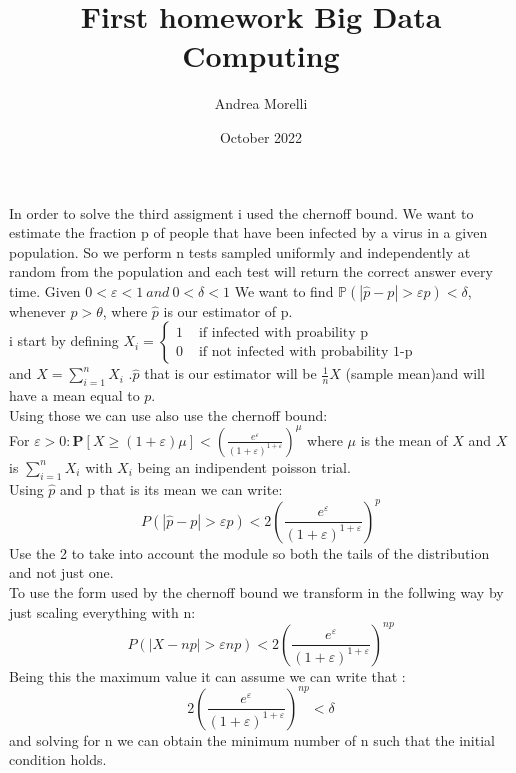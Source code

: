 \documentclass{article}
\title{First homework Big Data Computing}
\author{Andrea Morelli}
\date{October 2022}
\begin{document}
\maketitle

\section{}

\section{}



\section{}
In order to solve the third assigment i used the chernoff bound.
We want to estimate the fraction p of people that have been infected by a virus in a given population.
So we perform n tests sampled uniformly and independently at random from the population and each test will return the correct answer every time.
Given $0<\varepsilon<1   \ and  \ 0<\delta<1$ We want to find $\mathbb{P}(|\hat{p}-p|>\varepsilon p)<\delta$, whenever $p>\theta$,
where $\hat{p}$ is our estimator of p.\\
i start by defining \( X_{i}=\left\{\begin{array}{ll}1 & \text { if \ infected \ with \ proability \ p} \\ 0 & \text { if\ not \ infected \ with \ probability \ 1-p }\end{array}\right. \)
\\and $X=\sum ^{n}_{i=1}X_{i}$ .$\hat{p}$ that is our estimator will be \( \frac{1}{n} X \) (sample mean)and will have a mean equal to $p$.\\Using those we can use also use the chernoff bound:\\For $\varepsilon>0: \mathbf{P}[X \geq(1+\varepsilon) \mu]<\left(\frac{e^\varepsilon}{(1+\varepsilon)^{1+\varepsilon}}\right)^\mu$ where $\mu$ is the mean of $X$ and $X$ is $\sum ^{n}_{i=1}X_{i}$ with $X_{i}$ being an indipendent poisson trial.\\
Using $\hat{p}$ and p that is its mean we can write:\\
$$
P(|\hat{p}-p|>\varepsilon p)<2\left(\frac{e^\varepsilon}{(1+\varepsilon)^{1+\varepsilon}}\right)^p
$$
Use the 2 to take into account the module so both the tails of the distribution and not just one.\\
To use the form used by the chernoff bound we transform in the follwing way by just scaling everything with n:\\
$$
P(|X-np|>\varepsilon n p)<2\left(\frac{e^\varepsilon}{(1+\varepsilon)^{1+\varepsilon}}\right)^{np}
$$
Being this the maximum value it can assume we can write that :
$$2\left(\frac{e^\varepsilon}{(1+\varepsilon)^{1+\varepsilon}}\right)^{np}<\delta$$ and solving for n we can obtain the minimum number of n such that the initial condition holds.






\section{}
\end{document}
